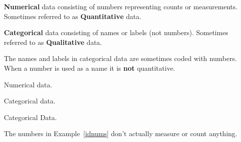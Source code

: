 \documentclass{beamer}
\begin{document}
\begin{frame}
\begin{definition}
\textbf{Numerical} data consisting of numbers representing counts or measurements. Sometimes referred to as \textbf{Quantitative} data.
\end{definition}\pause

\begin{definition}
\textbf{Categorical} data consisting of names or labels (not numbers). Sometimes referred to as \textbf{Qualitative} data.
\end{definition}\pause

\begin{note}
The names and labels in categorical data are sometimes coded with numbers. When a number is used as a name it is \textbf{not} quantitative.
\end{note}
\end{frame}

\begin{frame}
\begin{example}
\pause

\vspace{1mm}
Numerical data.\pause
\end{example}

\begin{example}
\pause

\vspace{1mm}
Categorical data. \pause

\end{example}

\begin{example}\label{idnums}
\pause

\vspace{1mm}
Categorical Data.
\end{example}\pause

\begin{note}
The numbers in Example~\ref{idnums} don't actually measure or count anything.
\end{note}
\end{frame}
\end{document}
